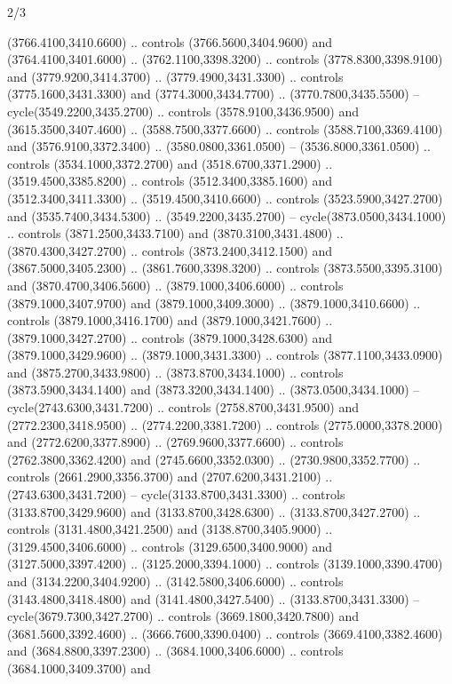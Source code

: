 \begin{flagdescription}{2/3}
\begin{scope}[shift={(0.5\flaglength,0.5)},scale=\flagwidth/130]
\begin{scope}[y=0.01mm, x=0.01mm,shift={(-3365,-2250)}]
  (3766.4100,3410.6600) .. controls (3766.5600,3404.9600) and
  (3764.4100,3401.6000) .. (3762.1100,3398.3200) .. controls
  (3778.8300,3398.9100) and (3779.9200,3414.3700) .. (3779.4900,3431.3300) ..
  controls (3775.1600,3431.3300) and (3774.3000,3434.7700) ..
  (3770.7800,3435.5500) -- cycle(3549.2200,3435.2700) .. controls
  (3578.9100,3436.9500) and (3615.3500,3407.4600) .. (3588.7500,3377.6600) ..
  controls (3588.7100,3369.4100) and (3576.9100,3372.3400) ..
  (3580.0800,3361.0500) -- (3536.8000,3361.0500) .. controls
  (3534.1000,3372.2700) and (3518.6700,3371.2900) .. (3519.4500,3385.8200) ..
  controls (3512.3400,3385.1600) and (3512.3400,3411.3300) ..
  (3519.4500,3410.6600) .. controls (3523.5900,3427.2700) and
  (3535.7400,3434.5300) .. (3549.2200,3435.2700) -- cycle(3873.0500,3434.1000)
  .. controls (3871.2500,3433.7100) and (3870.3100,3431.4800) ..
  (3870.4300,3427.2700) .. controls (3873.2400,3412.1500) and
  (3867.5000,3405.2300) .. (3861.7600,3398.3200) .. controls
  (3873.5500,3395.3100) and (3870.4700,3406.5600) .. (3879.1000,3406.6000) ..
  controls (3879.1000,3407.9700) and (3879.1000,3409.3000) ..
  (3879.1000,3410.6600) .. controls (3879.1000,3416.1700) and
  (3879.1000,3421.7600) .. (3879.1000,3427.2700) .. controls
  (3879.1000,3428.6300) and (3879.1000,3429.9600) .. (3879.1000,3431.3300) ..
  controls (3877.1100,3433.0900) and (3875.2700,3433.9800) ..
  (3873.8700,3434.1000) .. controls (3873.5900,3434.1400) and
  (3873.3200,3434.1400) .. (3873.0500,3434.1000) -- cycle(2743.6300,3431.7200)
  .. controls (2758.8700,3431.9500) and (2772.2300,3418.9500) ..
  (2774.2200,3381.7200) .. controls (2775.0000,3378.2000) and
  (2772.6200,3377.8900) .. (2769.9600,3377.6600) .. controls
  (2762.3800,3362.4200) and (2745.6600,3352.0300) .. (2730.9800,3352.7700) ..
  controls (2661.2900,3356.3700) and (2707.6200,3431.2100) ..
  (2743.6300,3431.7200) -- cycle(3133.8700,3431.3300) .. controls
  (3133.8700,3429.9600) and (3133.8700,3428.6300) .. (3133.8700,3427.2700) ..
  controls (3131.4800,3421.2500) and (3138.8700,3405.9000) ..
  (3129.4500,3406.6000) .. controls (3129.6500,3400.9000) and
  (3127.5000,3397.4200) .. (3125.2000,3394.1000) .. controls
  (3139.1000,3390.4700) and (3134.2200,3404.9200) .. (3142.5800,3406.6000) ..
  controls (3143.4800,3418.4800) and (3141.4800,3427.5400) ..
  (3133.8700,3431.3300) -- cycle(3679.7300,3427.2700) .. controls
  (3669.1800,3420.7800) and (3681.5600,3392.4600) .. (3666.7600,3390.0400) ..
  controls (3669.4100,3382.4600) and (3684.8800,3397.2300) ..
  (3684.1000,3406.6000) .. controls (3684.1000,3409.3700) and

\end{scope}
\end{scope}
\end{flagdescription}

